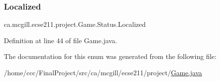 \subsubsection{\texorpdfstring{Localized}{Localized}}
{\footnotesize\ttfamily ca.\+mcgill.\+ecse211.\+project.\+Game.\+Status.\+Localized}



Definition at line 44 of file Game.\+java.



The documentation for this enum was generated from the following file\+:\begin{DoxyCompactItemize}
\item 
/home/ccc/\+Final\+Project/src/ca/mcgill/ecse211/project/\hyperlink{_game_8java}{Game.\+java}\end{DoxyCompactItemize}
